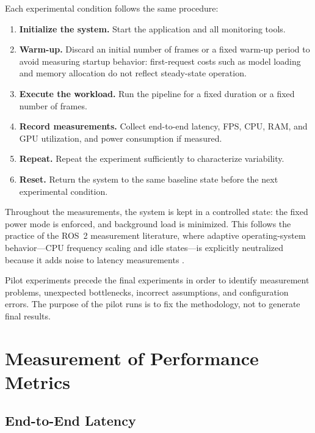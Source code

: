 Each experimental condition follows the same procedure:

\begin{enumerate}
  \item \textbf{Initialize the system.} Start the application and all
        monitoring tools.
  \item \textbf{Warm-up.} Discard an initial number of frames or a fixed
        warm-up period to avoid measuring startup behavior: first-request
        costs such as model loading and memory allocation do not reflect
        steady-state operation.
  \item \textbf{Execute the workload.} Run the pipeline for a fixed duration
        or a fixed number of frames.
  \item \textbf{Record measurements.} Collect end-to-end latency, FPS, CPU,
        RAM, and GPU utilization, and power consumption if measured.
  \item \textbf{Repeat.} Repeat the experiment sufficiently to characterize
        variability.
  \item \textbf{Reset.} Return the system to the same baseline state before
        the next experimental condition.
\end{enumerate}

Throughout the measurements, the system is kept in a controlled state:
the fixed power mode is enforced, and background load is minimized. This
follows the practice of the ROS~2 measurement literature, where adaptive
operating-system behavior---CPU frequency scaling and idle states---is
explicitly neutralized because it adds noise to latency measurements
\cite{kronauer2021}.

Pilot experiments precede the final experiments in order to identify
measurement problems, unexpected bottlenecks, incorrect assumptions, and
configuration errors. The purpose of the pilot runs is to fix the
methodology, not to generate final results.

\section{Measurement of Performance Metrics}
\label{sec:metric-measurement}

\subsection{End-to-End Latency}

